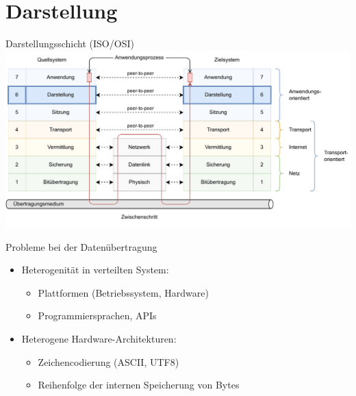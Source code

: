 \section{Darstellung}

\begin{defi}{Darstellungsschicht (ISO/OSI)}
    \includegraphics[width=\textwidth]{includes/figures/defi_iso_osi_presentation.pdf}
\end{defi}

\begin{bonus}{Probleme bei der Datenübertragung}
    \begin{itemize}
        \item Heterogenität in verteilten System:
              
              \begin{itemize}
                  \item Plattformen (Betriebssystem, Hardware)
                  \item Programmiersprachen, APIs
              \end{itemize}
        \item Heterogene Hardware-Architekturen:
              
              \begin{itemize}
                  \item Zeichencodierung (ASCII, UTF8)
                  \item Reihenfolge der internen Speicherung von Bytes
              \end{itemize}
    \end{itemize}
\end{bonus}

